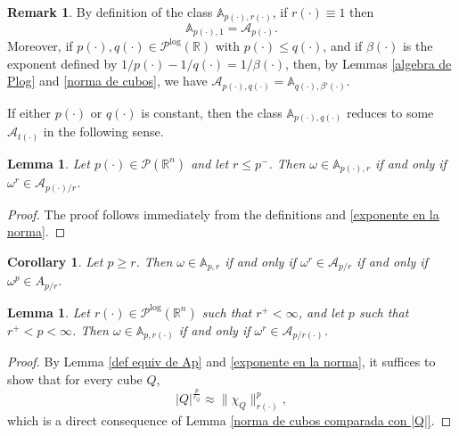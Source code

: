 \documentclass[a4paper,11pt,reqno]{amsart}
\theoremstyle{plain}
\numberwithin{equation}{section}
\newtheorem{lema}[teo]{Lemma}
\newtheorem{coro}[teo]{Corollary}
\theoremstyle{definition}
\newtheorem{remark}[teo]{Remark}
\newcommand{\R}{{\mathbb{R}^n}}
\begin{document}
\begin{remark}\label{equiv de Apq}
	By definition of the class $\mathbb{A}_{p(\cdot),r(\cdot)}$, if $r(\cdot)\equiv1$ then $$\mathbb{A}_{p(\cdot),1}=\mathcal{A}_{p(\cdot)}.$$ Moreover, if $p(\cdot), q(\cdot) \in \mathcal{P}^{\mathrm{log}}(\mathbb{R})$ with $p(\cdot) \le q(\cdot)$, and if $\beta(\cdot)$ is the exponent defined by $1/{p(\cdot)} - 1/{q(\cdot)} = 1/{\beta(\cdot)}$,
	then, by Lemmas \ref{algebra de Plog} and \ref{norma de cubos}, we have
	$\mathcal{A}_{p(\cdot),q(\cdot)} = \mathbb{A}_{q(\cdot),\beta'(\cdot)}$.
\end{remark}
If either $p(\cdot)$ or $q(\cdot)$ is constant, then the class $\mathbb{A}_{p(\cdot), q(\cdot)}$ reduces to some $\mathcal{A}_{t(\cdot)}$ in the following sense.
\begin{lema}
	Let ${p(\cdot)}\in\mathcal{P}(\R)$ and let $r\leq p^{-}$. Then $\omega\in\mathbb{A}_{{p(\cdot)},r}$ if and only if $\omega^r\in \mathcal{A}_{p(\cdot)/r}$. 
\end{lema}
\begin{proof}
The proof follows immediately from the definitions and \eqref{exponente en la norma}.
\end{proof}
\begin{coro}
	Let $p\geq r$. Then $\omega\in \mathbb{A}_{p,r}$ if and only if $\omega^r\in \mathcal{A}_{p/r}$ if and only if $\omega^p\in A_{p/r}$.
\end{coro}
\begin{lema}\label{Lema equivalencia entre clases Apr y Ap/r} Let ${r(\cdot)}\in \mathcal{P}^{\text{log}}(\R)$ such that $r^+<\infty$, and let $p$ such that $r^+<p<\infty$. Then
	$\omega\in\mathbb{A}_{p,{r(\cdot)}}$ if and only if $\omega^r\in \mathcal{A}_{p/r(\cdot)}$.
\end{lema}
\begin{proof} By Lemma \ref{def equiv de Ap} and \eqref{exponente en la norma}, it suffices to show that for every cube $Q$,
	$$|Q|^{\frac{p}{r_Q}} \approx \|\chi_Q\|_{r(\cdot)}^p,$$
	which is a direct consequence of Lemma \ref{norma de cubos comparada con |Q|}.
\end{proof}
\end{document}
